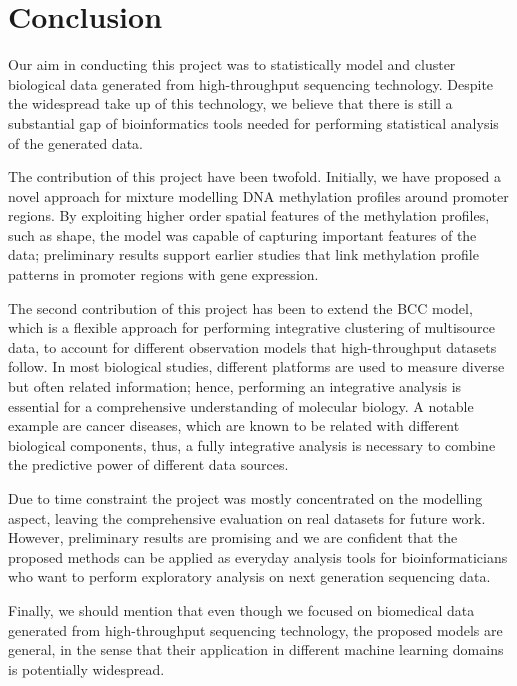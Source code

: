 \chapter{Conclusion} \label{conclusion-chapter}
Our aim in conducting this project was to statistically model and cluster biological data generated from high-throughput sequencing technology. Despite the widespread take up of this technology, we believe that there is still a substantial gap of bioinformatics tools needed for performing statistical analysis of the generated data.

The contribution of this project have been twofold. Initially, we have proposed a novel approach for mixture modelling DNA methylation profiles around promoter regions. By exploiting higher order spatial features of the methylation profiles, such as shape, the model was capable of capturing important features of the data; preliminary results support earlier studies that link methylation profile patterns in promoter regions with gene expression. 

The second contribution of this project has been to extend the BCC model, which is a flexible approach for performing integrative clustering of multisource data, to account for different observation models that high-throughput datasets follow. In most biological studies, different platforms are used to measure diverse but often related information; hence, performing an integrative analysis is essential for a comprehensive understanding of molecular biology. A notable example are cancer diseases, which are known to be related with different biological components, thus, a fully integrative analysis is necessary to combine the predictive power of different data sources.  

Due to time constraint the project was mostly concentrated on the modelling aspect, leaving the comprehensive evaluation on real datasets for future work. However, preliminary results are promising and we are confident that the proposed methods can be applied as everyday analysis tools for bioinformaticians who want to perform exploratory analysis on next generation sequencing data.

Finally, we should mention that even though we focused on biomedical data generated from high-throughput sequencing technology, the proposed models are general, in the sense that their application in different machine learning domains is potentially widespread. 

